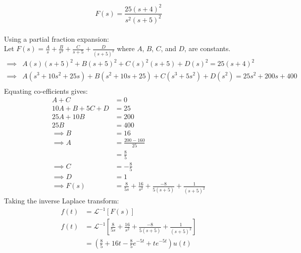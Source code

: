\begin{enumerate}
{		$$F(s) = \frac{25(s+4)^2}{s^2(s+5)^2}$$\\
		Using a partial fraction expansion:\\
		Let $F(s) = \frac{A}{s} + \frac{B}{s^2} + \frac{C}{s + 5} + \frac{D}{(s+5)^2}$
		where $A$, $B$, $C$, and $D$, are constants.
		\begin{align*}
		\implies &A(s)(s+5)^2 + B(s+5)^2 + C(s)^2(s+5) + D(s)^2 = 25(s+4)^2\\
		\implies &A(s^3 + 10s^2 + 25s) + B(s^2 + 10s + 25) + 
		C(s^3 + 5s^2) + D(s^2) = 25s^2 + 200s + 400\\
		\end{align*}
		Equating co-efficients gives:
		\begin{align*}
		A + C &= 0\\
		10 A + B + 5C + D &= 25\\
		25A + 10B &= 200\\
		25B &= 400\\
		\implies B &= 16\\
		\implies A &= \frac{200-160}{25}\\
		&= \frac{8}{5}\\
		\implies C &= -\frac{8}{5}\\
		\implies D &= 1\\
		\implies F(s) &= \frac{8}{5s} + \frac{16}{s^2} + \frac{-8}{5(s + 5)} + \frac{1}{(s+5)^2}
		\end{align*}
		Taking the inverse Laplace transform:
		\begin{align*}
		f(t) &= \mathcal{L}^{-1}[F(s)]\\
		f(t) &= \mathcal{L}^{-1}\left[\frac{8}{5s} + \frac{16}{s^2} + \frac{-8}{5(s + 5)} + \frac{1}{(s+5)^2}\right]\\
		&= \left(\frac{8}{5} + 16t - \frac{8}{5}e^{-5t} + te^{-5t}\right)u(t)
		\end{align*}

	}
	
\end{enumerate}